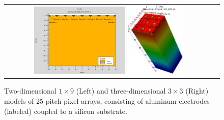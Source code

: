 \begin{figure}[htb]
  \begin{center}
    \begin{tabular}{cc}
      \includegraphics[width=0.45\textwidth]{fig_FastTiming/Materials.png}
      \includegraphics[width=0.275\textwidth]{fig_FastTiming/Model3D.png}
    \end{tabular}
    \caption{Two-dimensional $1 \times 9$ (Left) and three-dimensional $3 \times 3$ (Right) models of \SI{25}{\micron} pitch pixel arrays, consisting of aluminum electrodes (labeled) coupled to a silicon substrate.
            }
    \label{Materials_Model}
  \end{center}
\end{figure}
